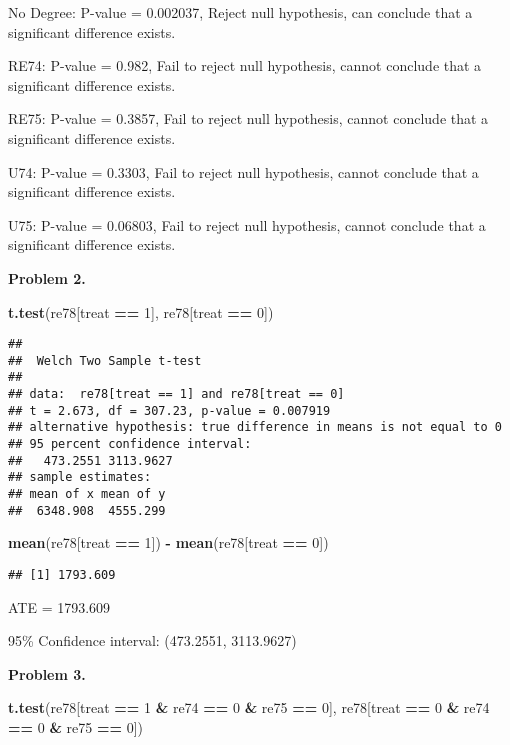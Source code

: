 \documentclass[
]{article}
\newenvironment{Shaded}{\begin{snugshade}}{\end{snugshade}}
\newcommand{\DecValTok}[1]{\textcolor[rgb]{0.00,0.00,0.81}{#1}}
\newcommand{\KeywordTok}[1]{\textcolor[rgb]{0.13,0.29,0.53}{\textbf{#1}}}
\newcommand{\NormalTok}[1]{#1}
\newcommand{\OperatorTok}[1]{\textcolor[rgb]{0.81,0.36,0.00}{\textbf{#1}}}
\newcommand{\StringTok}[1]{\textcolor[rgb]{0.31,0.60,0.02}{#1}}
\begin{document}
No Degree: P-value = 0.002037, Reject null hypothesis, can conclude that
a significant difference exists.

RE74: P-value = 0.982, Fail to reject null hypothesis, cannot conclude
that a significant difference exists.

RE75: P-value = 0.3857, Fail to reject null hypothesis, cannot conclude
that a significant difference exists.

U74: P-value = 0.3303, Fail to reject null hypothesis, cannot conclude
that a significant difference exists.

U75: P-value = 0.06803, Fail to reject null hypothesis, cannot conclude
that a significant difference exists.

\textbf{Problem 2.}

\begin{Shaded}
\begin{Highlighting}[]
\KeywordTok{t.test}\NormalTok{(re78[treat }\OperatorTok{==}\StringTok{ }\DecValTok{1}\NormalTok{], re78[treat }\OperatorTok{==}\StringTok{ }\DecValTok{0}\NormalTok{])}
\end{Highlighting}
\end{Shaded}

\begin{verbatim}
## 
##  Welch Two Sample t-test
## 
## data:  re78[treat == 1] and re78[treat == 0]
## t = 2.673, df = 307.23, p-value = 0.007919
## alternative hypothesis: true difference in means is not equal to 0
## 95 percent confidence interval:
##   473.2551 3113.9627
## sample estimates:
## mean of x mean of y 
##  6348.908  4555.299
\end{verbatim}

\begin{Shaded}
\begin{Highlighting}[]
\KeywordTok{mean}\NormalTok{(re78[treat }\OperatorTok{==}\StringTok{ }\DecValTok{1}\NormalTok{]) }\OperatorTok{-}\StringTok{ }\KeywordTok{mean}\NormalTok{(re78[treat }\OperatorTok{==}\StringTok{ }\DecValTok{0}\NormalTok{])}
\end{Highlighting}
\end{Shaded}

\begin{verbatim}
## [1] 1793.609
\end{verbatim}

ATE = 1793.609

95\% Confidence interval: (473.2551, 3113.9627)

\textbf{Problem 3.}

\begin{Shaded}
\begin{Highlighting}[]
\KeywordTok{t.test}\NormalTok{(re78[treat }\OperatorTok{==}\StringTok{ }\DecValTok{1} \OperatorTok{&}\StringTok{ }\NormalTok{re74 }\OperatorTok{==}\StringTok{ }\DecValTok{0} \OperatorTok{&}\StringTok{ }\NormalTok{re75 }\OperatorTok{==}\StringTok{ }\DecValTok{0}\NormalTok{], re78[treat }\OperatorTok{==}\StringTok{ }\DecValTok{0} \OperatorTok{&}\StringTok{ }\NormalTok{re74 }\OperatorTok{==}\StringTok{ }\DecValTok{0} \OperatorTok{&}\StringTok{ }\NormalTok{re75 }\OperatorTok{==}\StringTok{ }\DecValTok{0}\NormalTok{])}
\end{Highlighting}
\end{Shaded}
\end{document}
